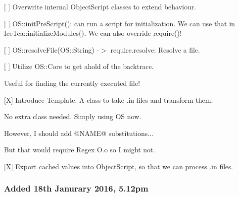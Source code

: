 \begin{DoxyItemize}
\item \mbox{[} \mbox{]} Overwrite internal Object\+Script classes to extend behaviour.
\begin{DoxyItemize}
\item \mbox{[} \mbox{]} {\ttfamily O\+S\+::init\+Pre\+Script()}\+: can run a script for initialization. We can use that in {\ttfamily Ice\+Tea\+::initialize\+Modules()}. We can also override {\ttfamily require()}!
\item \mbox{[} \mbox{]} {\ttfamily O\+S\+::resolve\+File(\+O\+S\+::\+String)} -\/$>$ {\ttfamily require.\+resolve}\+: Resolve a file.
\end{DoxyItemize}
\item \mbox{[} \mbox{]} Utilize {\ttfamily O\+S\+::\+Core} to get ahold of the backtrace.
\begin{DoxyItemize}
\item Useful for finding the currently executed file!
\end{DoxyItemize}
\item \mbox{[}X\mbox{]} Introduce {\ttfamily Template}. A class to take {\ttfamily .in} files and transform them.
\begin{DoxyItemize}
\item No extra class needed. Simply using OS now.
\item However, I should add {\ttfamily @N\+A\+ME@} substitutions...
\item But that would require Regex O.\+o so I might not.
\end{DoxyItemize}
\item \mbox{[}X\mbox{]} Export cached values into Object\+Script, so that we can process {\ttfamily .in} files.
\end{DoxyItemize}

\subsubsection*{Added 18th Janurary 2016, 5.\+12pm}



